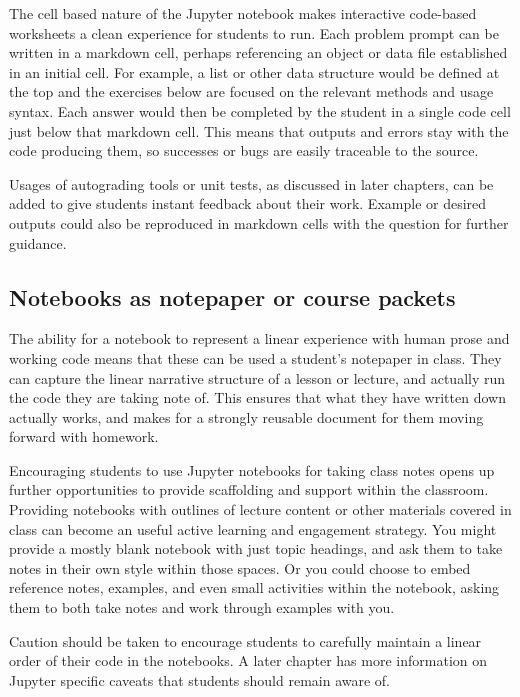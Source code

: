 \documentclass[]{book}
\begin{document}
The cell based nature of the Jupyter notebook makes interactive code-based
worksheets a clean experience for students to run. Each problem prompt can be
written in a markdown cell, perhaps referencing an object or data file
established in an initial cell. For example, a list or other data structure
would be defined at the top and the exercises below are focused on the relevant
methods and usage syntax. Each answer would then be completed by the student in
a single code cell just below that markdown cell. This means that outputs and
errors stay with the code producing them, so successes or bugs are easily
traceable to the source.

Usages of autograding tools or unit tests, as discussed in later chapters, can
be added to give students instant feedback about their work. Example or desired
outputs could also be reproduced in markdown cells with the question for further
guidance.

\hypertarget{notebooks-as-notepaper-or-course-packets}{%
\subsection{Notebooks as notepaper or course packets}\label{notebooks-as-notepaper-or-course-packets}}

The ability for a notebook to represent a linear experience with human prose and
working code means that these can be used a student's notepaper in class. They
can capture the linear narrative structure of a lesson or lecture, and actually
run the code they are taking note of. This ensures that what they have written
down actually works, and makes for a strongly reusable document for them moving
forward with homework.

Encouraging students to use Jupyter notebooks for taking class notes opens up
further opportunities to provide scaffolding and support within the classroom.
Providing notebooks with outlines of lecture content or other materials covered
in class can become an useful active learning and engagement strategy. You might
provide a mostly blank notebook with just topic headings, and ask them to take
notes in their own style within those spaces. Or you could choose to embed
reference notes, examples, and even small activities within the notebook, asking
them to both take notes and work through examples with you.

Caution should be taken to encourage students to carefully maintain a linear
order of their code in the notebooks. A later chapter has more information on
Jupyter specific caveats that students should remain aware of.
\end{document}
